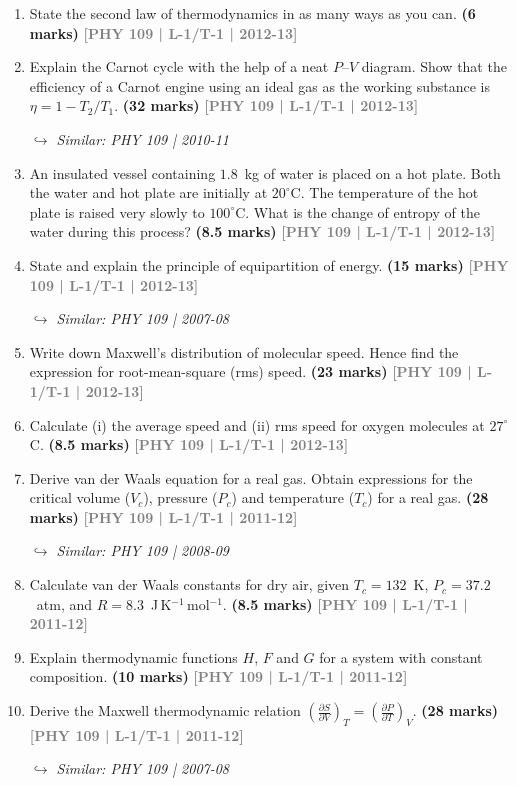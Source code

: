 \documentclass[12pt,a3paper]{article}
\newcommand{\yr}[1]{\hfill\textcolor{gray}{\small\textbf{[#1]}}}
\newcommand{\mk}[1]{\textcolor{orange!70!black}{\small\textbf{(#1 marks)}}}
\newcommand{\variant}[1]{\par\vspace{1pt}\textcolor{blue!50!black}%
  {\footnotesize\textit{$\hookrightarrow$ Similar: #1}}}
\begin{document}
\begin{enumerate}
\item State the second law of thermodynamics in as many ways as you can.
\mk{6} \yr{PHY 109 | L-1/T-1 | 2012-13}

\item Explain the Carnot cycle with the help of a neat $P$--$V$ diagram. Show that the efficiency of a Carnot engine using an ideal gas as the working substance is $\eta = 1 - T_2/T_1$.
\mk{32} \yr{PHY 109 | L-1/T-1 | 2012-13}
\variant{PHY 109 | 2010-11}

\item An insulated vessel containing $1.8$~kg of water is placed on a hot plate. Both the water and hot plate are initially at $20^\circ$C. The temperature of the hot plate is raised very slowly to $100^\circ$C. What is the change of entropy of the water during this process?
\mk{8.5} \yr{PHY 109 | L-1/T-1 | 2012-13}

\item State and explain the principle of equipartition of energy.
\mk{15} \yr{PHY 109 | L-1/T-1 | 2012-13}
\variant{PHY 109 | 2007-08}

\item Write down Maxwell's distribution of molecular speed. Hence find the expression for root-mean-square (rms) speed.
\mk{23} \yr{PHY 109 | L-1/T-1 | 2012-13}

\item Calculate (i) the average speed and (ii) rms speed for oxygen molecules at $27^\circ$C.
\mk{8.5} \yr{PHY 109 | L-1/T-1 | 2012-13}

\item Derive van der Waals equation for a real gas. Obtain expressions for the critical volume ($V_c$), pressure ($P_c$) and temperature ($T_c$) for a real gas.
\mk{28} \yr{PHY 109 | L-1/T-1 | 2011-12}
\variant{PHY 109 | 2008-09}

\item Calculate van der Waals constants for dry air, given $T_c = 132$~K, $P_c = 37.2$~atm, and $R = 8.3$~J\,K$^{-1}$\,mol$^{-1}$.
\mk{8.5} \yr{PHY 109 | L-1/T-1 | 2011-12}

\item Explain thermodynamic functions $H$, $F$ and $G$ for a system with constant composition.
\mk{10} \yr{PHY 109 | L-1/T-1 | 2011-12}

\item Derive the Maxwell thermodynamic relation $\left(\frac{\partial S}{\partial V}\right)_T = \left(\frac{\partial P}{\partial T}\right)_V$.
\mk{28} \yr{PHY 109 | L-1/T-1 | 2011-12}
\variant{PHY 109 | 2007-08}


\end{enumerate}
\end{document}
